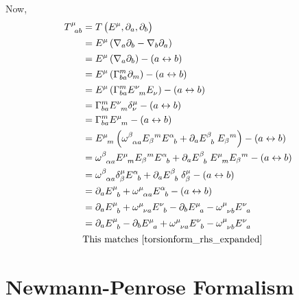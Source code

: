 Now, \begin{align*}
    \tt{T }{ \mu}{ ab} &= T \lera{ \tt{E}{ \mu}{}, \partial_a, \partial_b} \\
    &= \tt{E}{ \mu}{} \lera{ \cov{ \partial_b}{a}- \cov{ \partial_a}{b}} \\
    &= \tt{E}{ \mu}{} \left(\cov{ \partial_b}{a} \right) - \lera{ a \leftrightarrow b}\\
    &= \tt{E}{ \mu}{} \lera{ \cris{ m}{ba} \partial_m} -\lera{ a \leftrightarrow b} \\
    &= \tt{E}{ \mu}{ } \lera{ \cris{m}{ba} \tt{E}{ \nu}{m} \tt{E}{}{ \nu}} - \lera{ a \leftrightarrow b}\\
    &=\cris{m}{ba} \tt{E}{ \nu}{m} \kron{ \mu}{ \nu} - \lera{ a \leftrightarrow b}\\
    &=\cris{m}{ba} \tt{E}{ \mu}{m} - \lera{ a \leftrightarrow b}\\
    &= \tt{E}{ \mu}{m } \lera{ \tt{\omega}{\beta}{\alpha a} \du{E}{ \beta}{ m} \tt{E}{ \alpha}{b} + \partial_a \tt{E}{ \beta}{b} \; \du{E}{ \beta}{m}} - \lera{ a \leftrightarrow b}\\ 
    &= \tt{\omega}{\beta}{\alpha a} \tt{E}{ \mu}{m} \du{E}{ \beta}{m } \tt{E}{ \alpha}{b} + \partial_a \tt{E}{ \beta}{b} \;\tt{E}{ \mu}{m} \du{E}{ \beta}{m} - \lera{ a \leftrightarrow b}\\
    &= \tt{\omega}{\beta}{\alpha a} \kron{ \mu}{ \beta}\tt{E}{ \alpha}{b} + \partial_a \tt{E}{ \beta}{b} \; \kron{ \mu}{ \beta} - \lera{ a \leftrightarrow b}\\
    &= \partial_a \tt{E}{ \mu}{b} +\tt{\omega}{\mu}{\alpha a} \tt{E}{ \alpha}{b} - \lera{ a \leftrightarrow b}\\
    &= \partial_a \tt{E}{ \mu}{b} +\tt{\omega}{\mu}{\nu a} \tt{E}{ \nu}{b} -\partial_b \tt{E}{ \mu}{a} -\tt{\omega}{\mu}{\nu b} \tt{E}{ \nu}{a} \\
    &=\partial_a \tt{E}{ \mu}{b}-\partial_b \tt{E}{ \mu}{a}+\tt{\omega}{\mu}{\nu a} \tt{E}{ \nu}{b}-\tt{\omega}{\mu}{\nu b} \tt{E}{ \nu}{a}\\
    & \text{This matches \cref{torsionform_rhs_expanded}}
\end{align*}







\section{Newmann-Penrose Formalism}
















